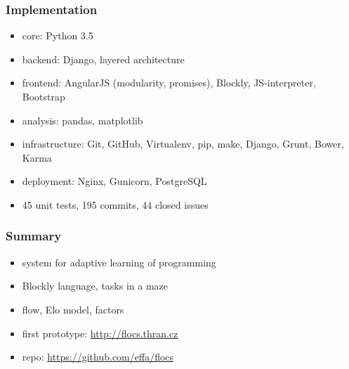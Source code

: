 \documentclass[xcolor=dvipsnames, 14pt]{beamer}
\begin{document}
\begin{frame}
\frametitle{Implementation}
\begin{itemize}
\item core: Python 3.5
\item backend: Django, layered architecture
\item frontend: AngularJS (modularity, promises), Blockly, JS-interpreter, Bootstrap
\item analysis: pandas, matplotlib
\item infrastructure: Git, GitHub, Virtualenv, pip, make, Django, Grunt, Bower, Karma
\item deployment: Nginx, Gunicorn, PostgreSQL
\item 45 unit tests, 195 commits, 44 closed issues
\end{itemize}
\end{frame}


\begin{frame}
\frametitle{Summary}
\begin{itemize}
\item system for adaptive learning of programming
\item Blockly language, tasks in a maze
\item flow, Elo model, factors
\item first prototype: \url{http://flocs.thran.cz}
\item repo: \url{https://github.com/effa/flocs}
\end{itemize}
\end{frame}
\end{document}
